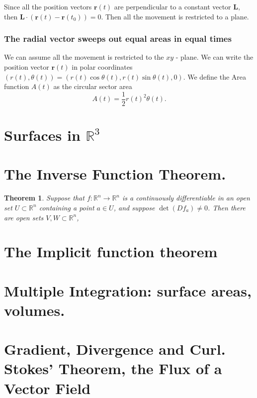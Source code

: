\documentclass{amsart}
\newtheorem{thm}{Theorem}
\begin{document}
Since all the position vectors \(\mathbf{r}(t)\) are perpendicular to a constant vector \(\mathbf{L}\), then  \(\mathbf{L}\cdot \left(\mathbf{r}(t) - \mathbf{r}(t_0)\right) = 0\). Then all the movement is restricted to a plane.


\subsubsection{The radial vector sweeps out equal areas in equal times}
\label{sec:orge1fcf66}

We can assume all the movement is restricted to the \(xy\) - plane. We can write the position vector \(\mathbf{r}(t)\) in polar coordinates \((r(t), \theta(t)) = (r(t)\cos\theta(t), r(t)\sin\theta(t), 0)\). We define the Area function \(A(t)\) as the circular sector area
\[ A(t) = \frac{1}{2} r(t)^2 \theta(t) .\]

\section{Surfaces in \(\mathbb{R}^3\)}
\label{sec:orgb012015}

\section{The Inverse Function Theorem.}
\label{sec:orgd5c07d6}
\begin{thm}
Suppose that \(f:\mathbb{R}^n \to \mathbb{R}^n\) is a continuously differentiable in an open set \(U\subset \mathbb{R}^n\) containing a point \(a\in U\), and suppose \(\det(Df_a) \neq 0\). Then there are open sets \(V,W\subset\mathbb{R}^n\), 
\end{thm}

\section{The Implicit function theorem}
\label{sec:org22d2d13}


\section{Multiple Integration: surface areas, volumes.}
\label{sec:org032d87e}

\section{Gradient, Divergence and Curl. Stokes’ Theorem, the Flux of a Vector Field}
\label{sec:orgdbfd622}
\end{document}
